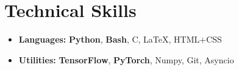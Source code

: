 \section*{Technical Skills}
\begin{itemize}[itemsep=0mm]

    \item \textbf{Languages:} \textbf{Python}, \textbf{Bash}, C, \LaTeX, HTML+CSS
    \item \textbf{Utilities:} \textbf{TensorFlow}, \textbf{PyTorch}, Numpy, Git, Asyncio

\end{itemize}
